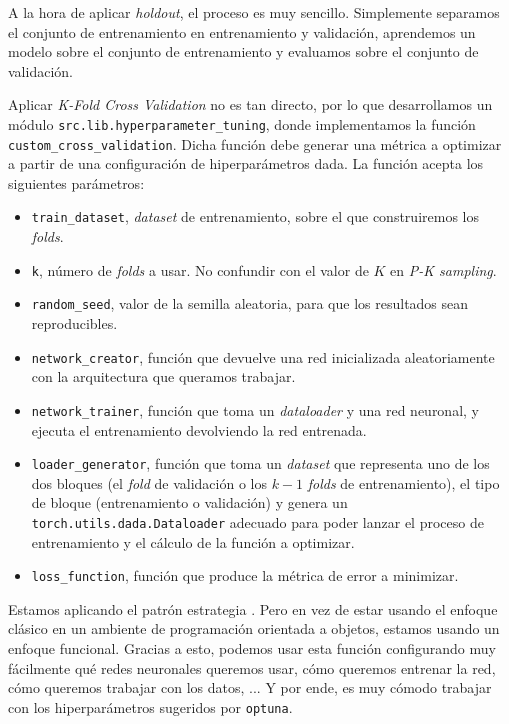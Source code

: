 A la hora de aplicar \textit{holdout}, el proceso es muy sencillo. Simplemente separamos el conjunto de entrenamiento en entrenamiento y validación, aprendemos un modelo sobre el conjunto de entrenamiento y evaluamos sobre el conjunto de validación.

Aplicar \textit{K-Fold Cross Validation} no es tan directo, por lo que desarrollamos un módulo \lstinline{src.lib.hyperparameter_tuning}, donde implementamos la función \lstinline{custom_cross_validation}. Dicha función debe generar una métrica a optimizar a partir de una configuración de hiperparámetros dada. La función acepta los siguientes parámetros:

\begin{itemize}
	\item \lstinline{train_dataset}, \textit{dataset} de entrenamiento, sobre el que construiremos los \textit{folds}.
	\item \lstinline{k}, número de \textit{folds} a usar. No confundir con el valor de $K$ en \textit{P-K sampling}.
	\item \lstinline{random_seed}, valor de la semilla aleatoria, para que los resultados sean reproducibles.
	\item \lstinline{network_creator}, función que devuelve una red inicializada aleatoriamente con la arquitectura que queramos trabajar.
	\item \lstinline{network_trainer}, función que toma un \textit{dataloader} y una red neuronal, y ejecuta el entrenamiento devolviendo la red entrenada.
	\item \lstinline{loader_generator}, función que toma un \textit{dataset} que representa uno de los dos bloques (el \textit{fold} de validación o los $k-1$ \textit{folds} de entrenamiento), el tipo de bloque (entrenamiento o validación) y genera un \lstinline{torch.utils.dada.Dataloader} adecuado para poder lanzar el proceso de entrenamiento y el cálculo de la función a optimizar.
	\item \lstinline{loss_function}, función que produce la métrica de error a minimizar.
\end{itemize}

Estamos aplicando el patrón estrategia \cite{informatica:design_patterns} \cite{informatica:strategy_pattern_web}. Pero en vez de estar usando el enfoque clásico en un ambiente de programación orientada a objetos, estamos usando un enfoque funcional. Gracias a esto, podemos usar esta función configurando muy fácilmente qué redes neuronales queremos usar, cómo queremos entrenar la red, cómo queremos trabajar con los datos, ... Y por ende, es muy cómodo trabajar con los hiperparámetros sugeridos por \lstinline{optuna}.

